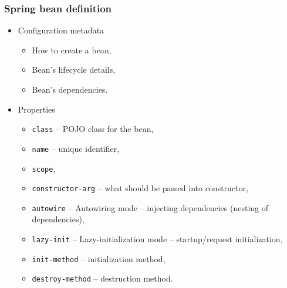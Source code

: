 \documentclass[10pt,xcolor=pdflatex, table]{beamer}
\begin{document}
\begin{frame}[fragile]\frametitle{Spring bean definition}
	\begin{itemize}
		\item Configuration metadata
          \begin{itemize}
        	\item How to create a bean,
        	\item Bean's lifecycle details,
        	\item Bean's dependencies.
          \end{itemize}
		\item Properties
          \begin{itemize}
        	\item \texttt{class} -- POJO class for the bean,
        	\item \texttt{name} -- unique identifier,
        	\item \texttt{scope},
        	\item \texttt{constructor-arg} -- what should be passed into constructor,
        	\item \texttt{autowire} -- Autowiring mode -- injecting dependencies (nesting of dependencies),
        	\item \texttt{lazy-init} -- Lazy-initialization mode -- startup/request initialization,
        	\item \texttt{init-method} -- initialization method,
        	\item \texttt{destroy-method} -- destruction method.
          \end{itemize}
	\end{itemize}
\end{frame}
\end{document}
